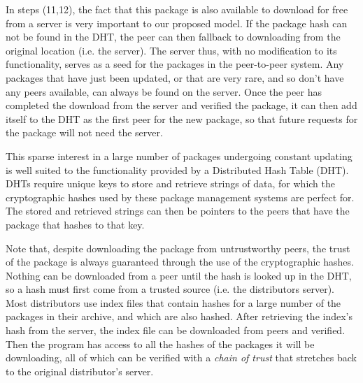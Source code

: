 \documentclass[conference]{IEEEtran}
\begin{document}
In steps (11,12), the fact that this package is also available to download for free
from a server is very important to our proposed model. If the package hash
can not be found in the DHT, the peer can then fallback to
downloading from the original location (i.e. the server).
The server thus, with no modification to its
functionality, serves as a seed for the packages in the peer-to-peer
system. Any packages that have just been updated, or that are very
rare, and so don't have any peers available, can always be found on
the server. Once the peer has completed the download from the server
and verified the package, it can then add itself to the DHT as the
first peer for the new package, so that future requests for the package
will not need the server.

This sparse
interest in a large number of packages undergoing constant updating
is well suited to the functionality provided by a Distributed Hash
Table (DHT). DHTs require unique keys to store and retrieve strings
of data, for which the cryptographic hashes used by these package
management systems are perfect for. The stored and retrieved strings
can then be pointers to the peers that have the package that hashes
to that key.

Note that, despite downloading the package from untrustworthy peers,
the trust of the package is always guaranteed through the use
of the cryptographic hashes. Nothing can be downloaded from a peer
until the hash is looked up in the DHT, so a hash must first come
from a trusted source (i.e. the distributors server). Most distributors use index
files that contain hashes for a large number of the packages in
their archive, and which are also hashed. After retrieving the
index's hash from the server, the index file can be downloaded from
peers and verified. Then the program has access to all the hashes of
the packages it will be downloading, all of which can be verified
with a \emph{chain of trust} that stretches back to the original
distributor's server.
\end{document}
